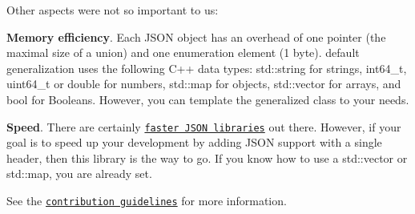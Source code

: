 Other aspects were not so important to us:\+


\begin{DoxyItemize}
\item {\bfseries{Memory efficiency}}. Each JSON object has an overhead of one pointer (the maximal size of a union) and one enumeration element (1 byte).  default generalization uses the following C++ data types:\+ {\ttfamily std::\+string} for strings, {\ttfamily int64\+\_\+t}, {\ttfamily uint64\+\_\+t} or {\ttfamily double} for numbers, {\ttfamily std::\+map} for objects, {\ttfamily std::\+vector} for arrays, and {\ttfamily bool} for Booleans. However, you can template the generalized class {\ttfamily {}} to your needs.
\item {\bfseries{Speed}}. There are certainly \href{https://github.com/miloyip/nativejson-benchmark\#parsing-time}{\texttt{faster JSON libraries}} out there. However, if your goal is to speed up your development by adding JSON support with a single header, then this library is the way to go. If you know how to use a {\ttfamily std::\+vector} or {\ttfamily std::\+map}, you are already set.
\end{DoxyItemize}

See the \href{https://github.com/nlohmann/json/blob/master/.github/CONTRIBUTING.md\#please-dont}{\texttt{contribution guidelines}} for more information. 